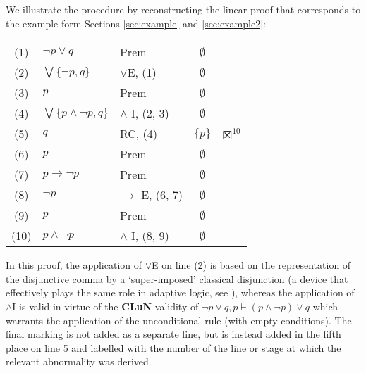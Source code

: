 \documentclass[]{article}
\begin{document}
We illustrate the procedure by reconstructing the linear proof that corresponds to the example form Sections \ref{sec:example} and \ref{sec:example2}:
\begin{center}
    \begin{tabular}{cllcl}
        (1) & $\neg p \vee q$ & Prem & $\emptyset$\\
        (2) & $\bigvee \{\neg p, q\}$ & $\vee$E, (1) & $\emptyset$\\
        (3) & $p$ & Prem & $\emptyset$\\
        (4) & $\bigvee \{p \wedge \neg p, q\}$ & $\wedge$ I, (2, 3) & $\emptyset$\\
        (5) & $q$ & RC, (4) & $\{p\}$ & $\XBox^{10}$\\
        (6) & $p$ & Prem & $\emptyset$\\
        (7) & $p \to \neg p$ & Prem & $\emptyset$\\
        (8) & $\neg p$ & $\to$ E, (6, 7) & $\emptyset$\\
        (9) & $p$ & Prem & $\emptyset$\\
        (10) & $p \wedge \neg p$ & $\wedge$ I, (8, 9) & $\emptyset$\\
    \end{tabular}
\end{center}
In this proof, the application of $\vee$E on line (2) is based on the representation of the disjunctive comma by a `super-imposed' classical disjunction (a device that effectively plays the same role in adaptive logic, see \cite[\S 2.2, 2.7]{Strasser:AdaptiveLogicsForDefeasibleReasoning:}), whereas the application of $\wedge$I is valid in virtue of the \textbf{CLuN}-validity of $\neg p \vee q, p \vdash (p \wedge \neg p) \vee q$ which warrants the application of the unconditional rule (with empty conditions). The final marking is not added as a separate line, but is instead added in the fifth place on line 5 and labelled with the number of the line or stage at which the relevant abnormality was derived.
\end{document}
